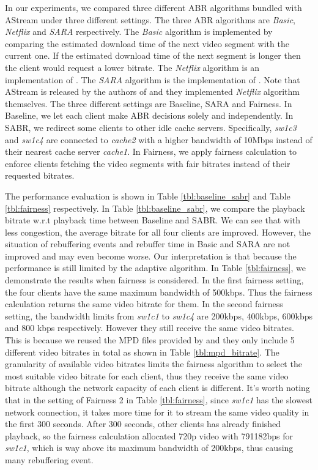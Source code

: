 \documentclass[12pt]{article}
\begin{document}
In our experiments, we compared three different ABR algorithms bundled with AStream under three different settings. The three ABR algorithms are \textit{Basic}, \textit{Netflix} and \textit{SARA} respectively. The \textit{Basic} algorithm is implemented by comparing the estimated download time of the next video segment with the current one. If the estimated download time of the next segment is longer then the client would request a lower bitrate. The \textit{Netflix} algorithm is an implementation of \cite{tyhuang}. The \textit{SARA} algorithm is the implementation of \cite{sara}. Note that AStream is released by the authors of \cite{sara} and they implemented \textit{Netflix} algorithm themselves. The three different settings are Baseline, SARA and Fairness. In Baseline, we let each client make ABR decisions solely and independently. In SABR, we redirect some clients to other idle cache servers. Specifically, \textit{sw1c3} and \textit{sw1c4} are connected to \textit{cache2} with a higher bandwidth of 10Mbps instead of their nearest cache server \textit{cache1}. In Fairness, we apply fairness calculation to enforce clients fetching the video segments with fair bitrates instead of their requested bitrates.

The performance evaluation is shown in Table \ref{tbl:baseline_sabr} and Table \ref{tbl:fairness} respectively. In Table \ref{tbl:baseline_sabr}, we compare the playback bitrate w.r.t playback time between Baseline and SABR. We can see that with less congestion, the average bitrate for all four clients are improved. However, the situation of rebuffering events and rebuffer time in Basic and SARA are not improved and may even become worse. Our interpretation is that because the performance is still limited by the adaptive algorithm. In Table \ref{tbl:fairness}, we demonstrate the results when fairness is considered. In the first fairness setting, the four clients have the same maximum bandwidth of 500kbps. Thus the fairness calculation returns the same video bitrate for them. In the second fairness setting, the bandwidth limits from \textit{sw1c1} to \textit{sw1c4} are 200kbps, 400kbps, 600kbps and 800 kbps respectively. However they still receive the same video bitrates. This is because we reused the MPD files provided by \cite{bhat_network_2017} and they only include 5 different video bitrates in total as shown in Table \ref{tbl:mpd_bitrate}. The granularity of available video bitrates limits the fairness algorithm to select the most suitable video bitrate for each client, thus they receive the same video bitrate although the network capacity of each client is different. It's worth noting that in the setting of Fairness 2 in Table \ref{tbl:fairness}, since \textit{sw1c1} has the slowest network connection, it takes more time for it to stream the same video quality in the first 300 seconds. After 300 seconds, other clients has already finished playback, so the fairness calculation allocated 720p video with 791182bps for \textit{sw1c1}, which is way above its maximum bandwidth of 200kbps, thus causing many rebuffering event.
\end{document}
